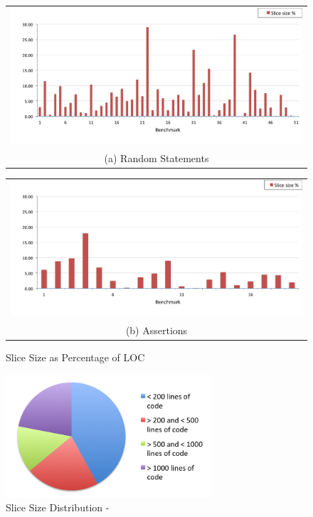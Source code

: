 \documentclass[12pt]{article}
\begin{document}
  \begin{figure}[H]
  \centering
  \begin{tabular}{@{}c@{}}
   \includegraphics[width=5in]{slice-size-percent.png} \\[\abovecaptionskip]
    \small (a) Random Statements
  \end{tabular}

  \vspace{\floatsep}

  \begin{tabular}{@{}c@{}}
    \includegraphics[width=5in]{slice-size-percent-assert.png} \\[\abovecaptionskip]
    \small (b) Assertions
  \end{tabular}
  
  \caption{Slice Size as Percentage of LOC}
  \label{slice size comparison}
\end{figure}


\begin{figure}[H]
     \centering
     \includegraphics[width=3in]{slice-size-distribution.png}
     \caption{Slice Size Distribution - }
     \label{slice size distribution Pie}
 \end{figure}
 
\end{document}
